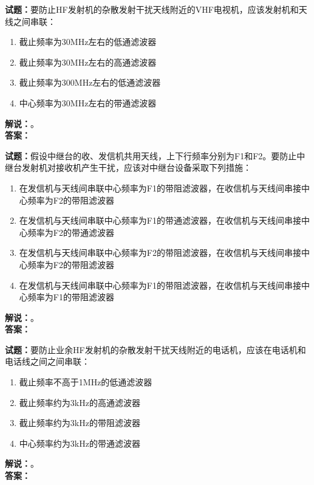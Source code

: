\documentclass{ctexbook}
\begin{document}
\noindent\textbf{试题：}要防止HF发射机的杂散发射干扰天线附近的VHF电视机，应该发射机和天线之间串联：
\begin{enumerate}[leftmargin=3em]
  \item 截止频率为30\unit{\MHz}左右的低通滤波器
  \item 截止频率为30\unit{\MHz}左右的高通滤波器
  \item 截止频率为300\unit{\MHz}左右的低通滤波器
  \item 中心频率为30\unit{\MHz}左右的带通滤波器
\end{enumerate}
\noindent\textbf{解说：}\textbf{}。\\\noindent\textbf{答案：}

\vspace{\baselineskip}

\noindent\textbf{试题：}假设中继台的收、发信机共用天线，上下行频率分别为F1和F2。要防止中继台发射机对接收机产生干扰，应该对中继台设备采取下列措施：
\begin{enumerate}[leftmargin=3em]
  \item 在发信机与天线间串联中心频率为F1的带阻滤波器，在收信机与天线间串接中心频率为F2的带阻滤波器
  \item 在发信机与天线间串联中心频率为F1的带通滤波器，在收信机与天线间串接中心频率为F2的带通滤波器
  \item 在发信机与天线间串联中心频率为F2的带阻滤波器，在收信机与天线间串接中心频率为F2的带阻滤波器
  \item 在发信机与天线间串联中心频率为F1的带阻滤波器，在收信机与天线间串接中心频率为F1的带阻滤波器
\end{enumerate}
\noindent\textbf{解说：}\textbf{}。\\\noindent\textbf{答案：}

\vspace{\baselineskip}

\noindent\textbf{试题：}要防止业余HF发射机的杂散发射干扰天线附近的电话机，应该在电话机和电话线之间之间串联：
\begin{enumerate}[leftmargin=3em]
  \item 截止频率不高于1\unit{\MHz}的低通滤波器
  \item 截止频率约为3\unit{\kHz}的高通滤波器
  \item 截止频率约为3\unit{\kHz}的带阻滤波器
  \item 中心频率约为3\unit{\kHz}的带通滤波器
\end{enumerate}
\noindent\textbf{解说：}\textbf{}。\\\noindent\textbf{答案：}
\end{document}
